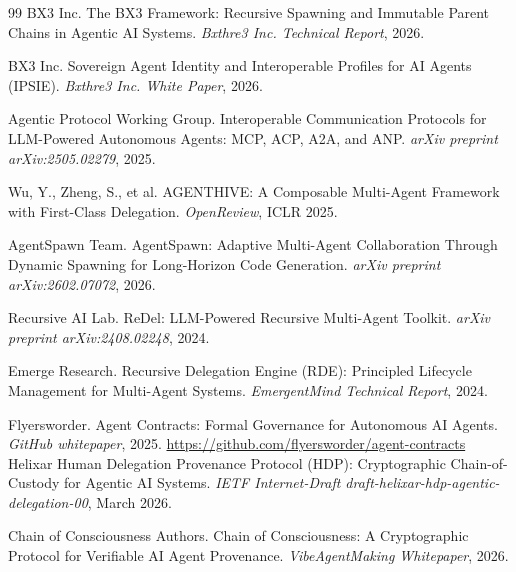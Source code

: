 \begin{thebibliography}{99}
BX3 Inc. \newblock The BX3 Framework: Recursive Spawning and Immutable Parent Chains in Agentic AI Systems.
\newblock \emph{Bxthre3 Inc. Technical Report}, 2026.

BX3 Inc. \newblock Sovereign Agent Identity and Interoperable Profiles for AI Agents (IPSIE).
\newblock \emph{Bxthre3 Inc. White Paper}, 2026.

Agentic Protocol Working Group. \newblock Interoperable Communication Protocols for LLM-Powered Autonomous Agents: MCP, ACP, A2A, and ANP.
\newblock \emph{arXiv preprint arXiv:2505.02279}, 2025.

Wu, Y., Zheng, S., et al. \newblock AGENTHIVE: A Composable Multi-Agent Framework with First-Class Delegation.
\newblock \emph{OpenReview}, ICLR 2025.

AgentSpawn Team. \newblock AgentSpawn: Adaptive Multi-Agent Collaboration Through Dynamic Spawning for Long-Horizon Code Generation.
\newblock \emph{arXiv preprint arXiv:2602.07072}, 2026.

Recursive AI Lab. \newblock ReDel: LLM-Powered Recursive Multi-Agent Toolkit.
\newblock \emph{arXiv preprint arXiv:2408.02248}, 2024.

Emerge Research. \newblock Recursive Delegation Engine (RDE): Principled Lifecycle Management for Multi-Agent Systems.
\newblock \emph{EmergentMind Technical Report}, 2024.

Flyersworder. \newblock Agent Contracts: Formal Governance for Autonomous AI Agents. \newblock \emph{GitHub whitepaper}, 2025. \newblock \url{https://github.com/flyersworder/agent-contracts}
Helixar \newblock Human Delegation Provenance Protocol (HDP): Cryptographic Chain-of-Custody for Agentic AI Systems.
\newblock \emph{IETF Internet-Draft draft-helixar-hdp-agentic-delegation-00}, March 2026.

Chain of Consciousness Authors. \newblock Chain of Consciousness: A Cryptographic Protocol for Verifiable AI Agent Provenance.
\newblock \emph{VibeAgentMaking Whitepaper}, 2026.


\end{thebibliography}
